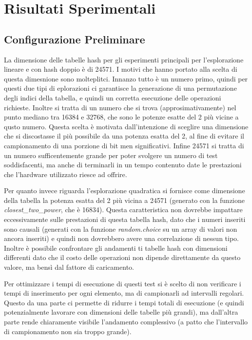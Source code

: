 \documentclass{article}
\begin{document}
\section{Risultati Sperimentali}

\subsection{Configurazione Preliminare}

La dimensione delle tabelle hash per gli esperimenti principali per l'esplorazione lineare e con hash doppio è di 24571. I motivi che hanno portato alla scelta di questa dimesnione sono molteplitci. Innanzo tutto è un numero primo, quindi per questi due tipi di eplorazioni ci garantisce la generazione di una permutazione degli indici della tabella, e quindi un corretta esecuzione delle operazioni richieste. Inoltre si tratta di un numero che si trova (approsimativamente) nel punto mediano tra 16384 e 32768, che sono le potenze esatte del 2 più vicine a qusto numero. Questa scelta è motivata dall'intenzione di sceglire una dimensione che si discostasse il più possibile da una potenza esatta del 2, al fine di evitare il campionamento di una porzione di bit men significativi. Infine 24571 si tratta di un numero sufficentemente grande per poter svolgere un numero di test soddisfacenti, ma anche di terminarli in un tempo contenuto date le prestazioni che l'hardware utilizzato riesce ad offrire.

Per quanto invece riguarda l'esplorazione quadratica si fornisce come dimensione della tabella la potenza esatta del 2 più vicina a 24571 (generato con la funzione \emph{closest\_two\_power}, che è 16834). Questa caratteristica non dovrebbe impattare eccessivamente sulle prestazioni di questa tabella hash, dato che i numeri inseriti sono causali (generati con la funzione \emph{random.choice} su un array di valori non ancora inseriti) e quindi non dovrebbero avere una correlazione di nessun tipo. Inoltre è possibile confrontare gli andamenti ti tabelle hash con dimensioni differenti dato che il costo delle operazioni non dipende direttamente da questo valore, ma bensì dal fattore di caricamento.

Per ottimizzare i tempi di esecuzione di questi test si è scelto di non verificare i tempi di inserimento per ogni elemento, ma di campionarli ad intervalli regolari. Questo da una parte ci permette di ridurre i tempi totali di esecuzione (e quindi potenzialmente lavorare con dimensioni delle tabelle più grandi), ma dall'altra parte rende chiaramente visibile l'andamento complessivo (a patto che l'intervallo di campionamento non sia troppo grande).
\end{document}
